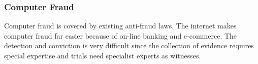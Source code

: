 \subsubsection{Computer Fraud}\label{ssub:computer_fraud}

Computer fraud is covered by existing anti-fraud laws.
The internet makes computer fraud far easier because of on-line banking and e-commerce.
The detection and conviction is very difficult since the collection of evidence requires special expertise and trials need specialist experts as witnesses.

